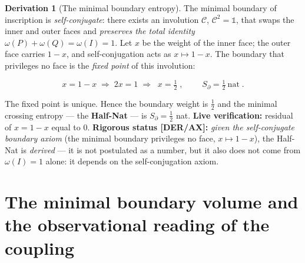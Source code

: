 \documentclass[11pt]{article}
\theoremstyle{definition}\newtheorem{deriv}{Derivation}
\begin{document}
\begin{deriv}[The minimal boundary entropy]

The minimal boundary of inscription is \emph{self-conjugate}: there exists an involution $\mathcal{C}$, $\mathcal{C}^2=\mathbb{1}$, that swaps the inner and outer faces and \emph{preserves the total identity} $\omega(P)+\omega(Q)=\omega(I)=1$. Let $x$ be the weight of the inner face; the outer face carries $1-x$, and self-conjugation acts as $x\mapsto 1-x$. The boundary that privileges no face is the \emph{fixed point} of this involution:

\begin{equation}x=1-x\;\Longrightarrow\;2x=1\;\Longrightarrow\;\boxed{\;x=\tfrac12\;},\qquad\boxed{\;S_\partial=\tfrac12\ \text{nat}\;}.\end{equation}

The fixed point is unique. Hence the boundary weight is $\tfrac12$ and the minimal crossing entropy --- the \textbf{Half-Nat} --- is $S_\partial=\tfrac12$ nat. \textbf{Live verification:} residual of $x=1-x$ equal to $0$. \textbf{Rigorous status \textsf{[DER/AX]}:} \emph{given the self-conjugate boundary axiom} (the minimal boundary privileges no face, $x\mapsto1-x$), the Half-Nat is \emph{derived} --- it is not postulated as a number, but it also does not come from $\omega(I)=1$ alone: it depends on the self-conjugation axiom.\end{deriv}

\section{The minimal boundary volume and the observational reading of the coupling}
\end{document}
